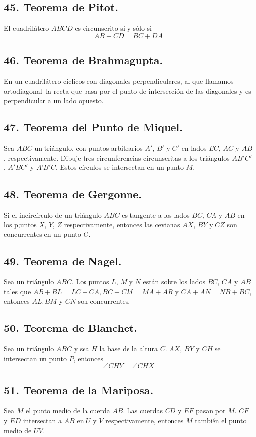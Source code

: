 \documentclass[12pt,a4paper]{article}
\begin{document}
\subsection*{45. Teorema de Pitot.}
El cuadrilátero $ABCD$ es circunscrito si y sólo si $$AB + CD = BC +DA$$
\subsection*{46. Teorema de Brahmagupta.}
En un cuadrilátero cíclicos con diagonales perpendiculares, al que llamamos ortodiagonal, la recta que pasa por el punto de intersección de las diagonales y es perpendicular a un lado opuesto.
\subsection*{47. Teorema del Punto de Miquel.}
Sea $ABC$ un triángulo, con puntos arbitrarios $A'$, $B'$ y $C'$ en lados $BC$, $AC$ y $AB$ , respectivamente. Dibuje tres circunferencias circunscritas a los triángulos $AB'C'$, $A'BC'$ y $A'B'C$. Estos círculos se intersectan en un punto $M$.
\subsection*{48. Teorema de Gergonne.}
Si el incircírculo de un triángulo $ABC$ es tangente a los lados $BC$, $CA$ y $AB$ en los p;untos $X$, $Y$, $Z$ respectivamente, entonces las cevianas  $AX$, $BY$ y $CZ$ son concurrentes en un punto $G.$
\subsection*{49. Teorema de Nagel.}
Sea un triángulo $ABC$. Los puntos $L$, $M$ y $N$ están sobre los lados $BC$, $CA$ y $AB$ tales que $AB + BL = LC + CA, BC + CM= MA + AB$ y $CA + AN= NB + BC$, entonces $AL, BM$ y $CN$ son concurrentes.
\subsection*{50. Teorema de Blanchet.}
Sea un triángulo $ABC$ y sea $H$ la base de la altura $C$. $AX$, $BY$ y $CH$ se intersectan un punto $P$, entonces $$\angle CHY = \angle CHX$$
\subsection*{51. Teorema de la Mariposa.}
Sea $M$ el punto medio de la cuerda $AB$. Las cuerdas $CD$ y $EF$ pasan por $M$. $CF$ y $ED$ intersectan a $AB$ en $U$ y $V$ respectivamente, entonces $M$ también el punto medio de $UV$.
\end{document}
